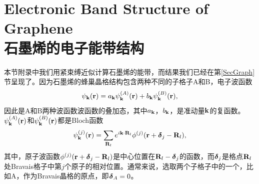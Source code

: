 \documentclass[10pt]{book}
\newcommand{\deltab}{\mbox{\boldmath $\delta $}}
\newcommand{\bk}{{\bf k}}
\newcommand{\br}{{\bf r}}
\newcommand{\bR}{{\bf R}}
\newcommand{\beq}{\begin{equation}}
\newcommand{\eeq}{\end{equation}}
\begin{document}
\fi



\appendix

\chapter[石墨烯的电子能带结构]{Electronic Band Structure of Graphene\\\bf 石墨烯的电子能带结构}
\label{TBgraphene}


本节附录中我们用紧束缚近似计算石墨烯的能带\cite{wallace}，而结果我们已经在第\ref{SecGraph}节呈现了。因为石墨烯的蜂巢晶格结构包含两种不同的子格子A和B，电子波函数
\beq\label{eq2:06}
\psi_{\bk}(\br)=a_{\bk}\psi^{(A)}_{\bk}(\br)+b_{\bk}\psi^{(B)}_{\bk}(\br),
\eeq
因此是A和B两种波函数波函数的叠加态，其中$a_{\bk}$，$b_{\bk}$，是准动量$\bk$的复函数。$\psi^{(A)}_{\bk}(\br)$和$\psi^{(B)}_{\bk}(\br)$都是Bloch函数
\beq\label{eq2:07}
\psi_{\bk}^{(j)}(\br)=\sum_{\bR_l}e^{i\bk\cdot\bR_l}\phi^{(j)}(\br+\deltab_j-\bR_l),
\eeq
其中，原子波函数$\phi^{(j)}(\br+\deltab_j-\bR_l)$是中心位置在$\bR_l-\deltab_j$的函数，而$\deltab_j$是格点$\bR_l$处Bravais格子中第$j$个原子的相对位置。通常来说，选取两个子格子中的一个，比如A，作为Bravais晶格的原点，即$\deltab_A=0$。
\end{document}
